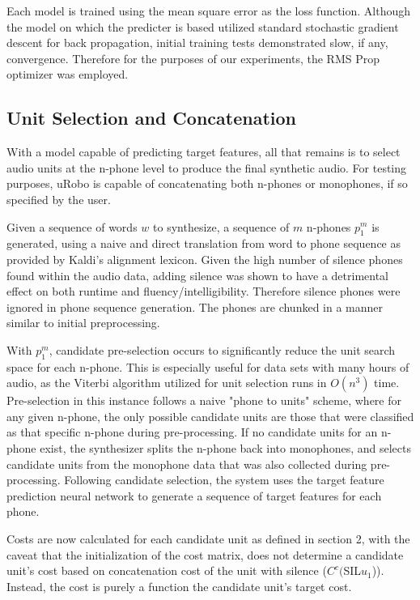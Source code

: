 \documentclass[10pt, journal, compsoc]{IEEEtran}
\begin{document}
Each model is trained using the mean square error as the loss function. Although the model on which the predicter is based utilized standard stochastic gradient descent\cite{unknowndnn} for back propagation, initial training tests demonstrated slow, if any, convergence. Therefore for the purposes of our experiments, the RMS Prop optimizer was employed.\par
\subsection{Unit Selection and Concatenation}
With a model capable of predicting target features, all that remains is to select audio units at the n-phone level to produce the final synthetic audio. For testing purposes, uRobo is capable of concatenating both n-phones or monophones, if so specified by the user.\par 
Given a sequence of words $w$ to synthesize, a sequence of $m$ n-phones $p_1^m$ is generated, using a naive and direct translation from word to phone sequence as provided by Kaldi's alignment lexicon. Given the high number of silence phones found within the audio data, adding silence was shown to have a detrimental effect on both runtime and fluency/intelligibility. Therefore silence phones were ignored in phone sequence generation. The phones are chunked in a manner similar to initial preprocessing.\par 
With $p_1^m$, candidate pre-selection occurs to significantly reduce the unit search space for each n-phone. This is especially useful for data sets with many hours of audio, as the Viterbi algorithm utilized for unit selection runs in $O(n^3)$ time. Pre-selection in this instance follows a naive "phone to units" scheme, where for any given n-phone, the only possible candidate units are those that were classified as that specific n-phone during pre-processing. If no candidate units for an n-phone exist, the synthesizer splits the n-phone back into monophones, and selects candidate units from the monophone data that was also collected during pre-processing. Following candidate selection, the system uses the target feature prediction neural network to generate a sequence of target features for each phone.\par 
Costs are now calculated for each candidate unit as defined in section 2, with the caveat that the initialization of the cost matrix, does not determine a candidate unit's cost based on concatenation cost of the unit with silence ($C^c($SIL$u_1$)). Instead, the cost is purely a function the candidate unit's target cost.\par
\end{document}
